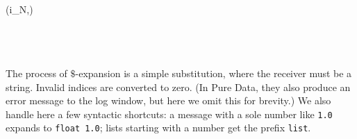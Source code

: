 \begin{hscode}
\\
\>[7]{}\<[10]%
\>[10]{}\;\;(i_{N},)\;\;\<[E]%
\\
\>[4]{}\<[7]%
\>[7]{}\;\to {}\<[E]%
\\
\>[7]{}\<[10]%
\>[10]{}\;\;\;\;\<[E]%
\\
\>[4]{}\<[7]%
\>[7]{}\to {}\<[E]%
\\
\>[7]{}\<[10]%
\>[10]{}\;\<[E]%
\ColumnHook
\end{hscode}\resethooks

The process of $\$$-expansion is a simple substitution, where the receiver
must be a string. Invalid indices are converted to zero. (In Pure Data, they
also produce an error message to the log window, but here we omit this for
brevity.) We also handle here a few syntactic shortcuts: a message with a
sole number like \texttt{1.0} expands to \texttt{float 1.0}; lists starting
with a number get the prefix \texttt{list}.

